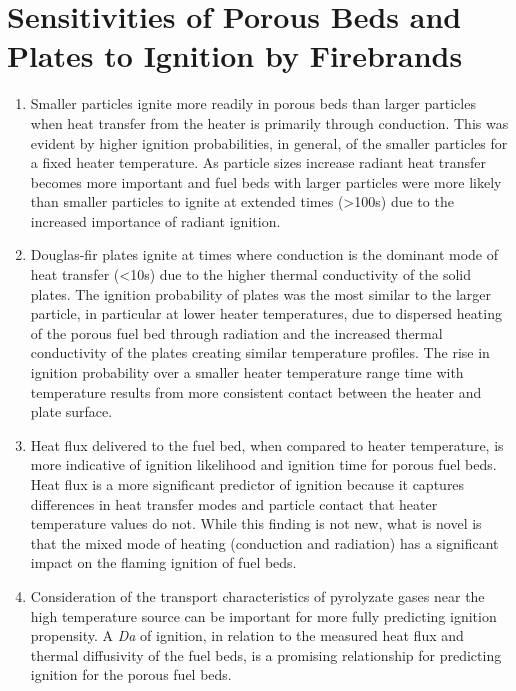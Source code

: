 \section{Sensitivities of Porous Beds and Plates to Ignition by Firebrands}
        \begin{enumerate}
            \item 
                Smaller particles ignite more readily in porous beds than larger particles when heat transfer from the heater is primarily through conduction. This was evident by higher ignition probabilities, in general, of the smaller particles for a fixed heater temperature. As particle sizes increase radiant heat transfer becomes more important and fuel beds with larger particles were more likely than smaller particles to ignite at extended times (\textgreater 100\si{\second}) due to the increased importance of radiant ignition. 
            \item
                Douglas-fir plates ignite at times where conduction is the dominant mode of heat transfer (\textless 10\si{\second}) due to the higher thermal conductivity of the solid plates. The ignition probability of plates was the most similar to the larger particle, in particular at lower heater temperatures, due to dispersed heating of the porous fuel bed through radiation and the increased thermal conductivity of the plates creating similar temperature profiles. The rise in ignition probability  over a smaller heater temperature range time with temperature results from more consistent contact between the heater and plate surface.
            \item 
                Heat flux delivered to the fuel bed, when compared to heater temperature, is more indicative of ignition likelihood and ignition time for porous fuel beds. Heat flux is a more significant predictor of ignition because it captures differences in heat transfer modes and particle contact that heater temperature values do not. While this finding is not new, what is novel is that the mixed mode of heating (conduction and radiation) has a significant impact on the flaming ignition of fuel beds.
            \item 
                Consideration of the transport characteristics of pyrolyzate gases near the high temperature source can be important for more fully predicting ignition propensity. A \textit{Da} of ignition, in relation to the measured heat flux and thermal diffusivity of the fuel beds, is a promising relationship for predicting ignition for the porous fuel beds.  
        \end{enumerate}


